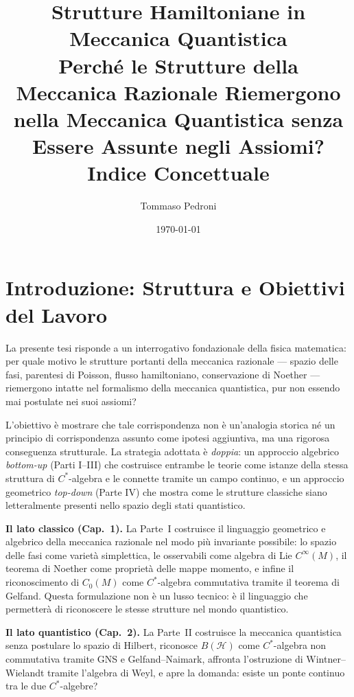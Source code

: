 \documentclass[12pt, a4paper]{article}
\title{%
	\textbf{Strutture Hamiltoniane in Meccanica Quantistica}\\[6pt]
	\large Perché le Strutture della Meccanica Razionale Riemergono\\
	nella Meccanica Quantistica senza Essere Assunte negli Assiomi?\\[4pt]
	\normalsize Indice Concettuale
}
\author{Tommaso Pedroni}
\date{\today}
\begin{document}
	
	\maketitle
	\tableofcontents
	\newpage
	
	\section*{Introduzione: Struttura e Obiettivi del Lavoro}
	
	La presente tesi risponde a un interrogativo fondazionale della fisica matematica:
	per quale motivo le strutture portanti della meccanica razionale ---
	spazio delle fasi, parentesi di Poisson, flusso hamiltoniano, conservazione di Noether
	--- riemergono intatte nel formalismo della meccanica quantistica, pur non essendo mai
	postulate nei suoi assiomi?
	
	L'obiettivo è mostrare che tale corrispondenza non è un'analogia storica né un
	principio di corrispondenza assunto come ipotesi aggiuntiva, ma una rigorosa
	conseguenza strutturale. La strategia adottata è \emph{doppia}: un approccio
	algebrico \textit{bottom-up} (Parti I--III) che costruisce entrambe le teorie come
	istanze della stessa struttura di $C^*$-algebra e le connette tramite un campo
	continuo, e un approccio geometrico \textit{top-down} (Parte IV) che mostra come
	le strutture classiche siano letteralmente presenti nello spazio degli stati quantistico.
	
	\medskip
	
	\textbf{Il lato classico (Cap.\ 1).}
	La Parte~I costruisce il linguaggio geometrico e algebrico della meccanica razionale
	nel modo più invariante possibile: lo spazio delle fasi come varietà simplettica,
	le osservabili come algebra di Lie $C^\infty(M)$, il teorema di Noether come proprietà
	delle mappe momento, e infine il riconoscimento di $C_0(M)$ come $C^*$-algebra
	commutativa tramite il teorema di Gelfand. Questa formulazione non è un lusso tecnico:
	è il linguaggio che permetterà di riconoscere le stesse strutture nel mondo quantistico.
	
	\medskip
	
	\textbf{Il lato quantistico (Cap.\ 2).}
	La Parte~II costruisce la meccanica quantistica senza postulare lo spazio di Hilbert,
	riconosce $B(\mathcal{H})$ come $C^*$-algebra non commutativa tramite GNS e
	Gelfand--Naimark, affronta l'ostruzione di Wintner--Wielandt tramite l'algebra di
	Weyl, e apre la domanda: esiste un ponte continuo tra le due $C^*$-algebre?
	
\end{document}
